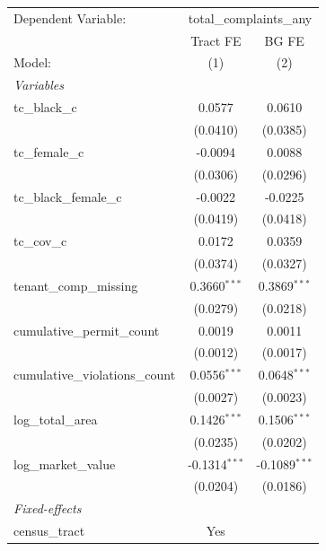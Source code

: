 \begingroup
\centering
\begin{tabular}{lcc}
   \tabularnewline \midrule \midrule
   Dependent Variable: & \multicolumn{2}{c}{total\_complaints\_any}\\
                                   & Tract FE        & BG FE \\   
   Model:                          & (1)             & (2)\\  
   \midrule
   \emph{Variables}\\
   tc\_black\_c                    & 0.0577          & 0.0610\\   
                                   & (0.0410)        & (0.0385)\\   
   tc\_female\_c                   & -0.0094         & 0.0088\\   
                                   & (0.0306)        & (0.0296)\\   
   tc\_black\_female\_c            & -0.0022         & -0.0225\\   
                                   & (0.0419)        & (0.0418)\\   
   tc\_cov\_c                      & 0.0172          & 0.0359\\   
                                   & (0.0374)        & (0.0327)\\   
   tenant\_comp\_missing           & 0.3660$^{***}$  & 0.3869$^{***}$\\   
                                   & (0.0279)        & (0.0218)\\   
   cumulative\_permit\_count       & 0.0019          & 0.0011\\   
                                   & (0.0012)        & (0.0017)\\   
   cumulative\_violations\_count   & 0.0556$^{***}$  & 0.0648$^{***}$\\   
                                   & (0.0027)        & (0.0023)\\   
   log\_total\_area                & 0.1426$^{***}$  & 0.1506$^{***}$\\   
                                   & (0.0235)        & (0.0202)\\   
   log\_market\_value              & -0.1314$^{***}$ & -0.1089$^{***}$\\   
                                   & (0.0204)        & (0.0186)\\   
   \midrule
   \emph{Fixed-effects}\\
   census\_tract                   & Yes             & \\  

\end{tabular}
